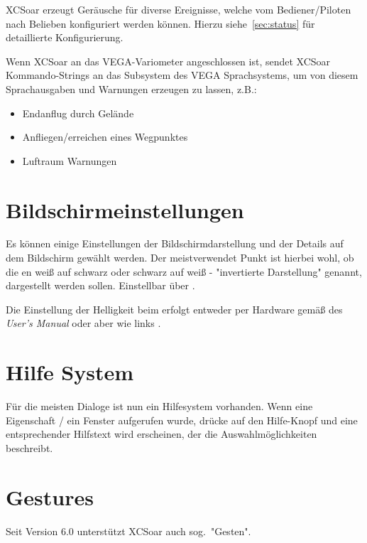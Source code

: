 \textsf{XCSoar} erzeugt Geräusche für diverse Ereignisse, welche vom Bediener/Piloten  nach Belieben konfiguriert werden können.
Hierzu siehe~\ref{sec:status} für detaillierte Konfigurierung.

Wenn \textsf{XCSoar} an das VEGA-Variometer angeschlossen ist,  sendet \textsf{XCSoar} Kommando-Strings an das Subsystem des VEGA Sprachsystems, um von diesem Sprachausgaben und Warnungen erzeugen zu lassen, z.B.:

\begin{itemize}
\item Endanflug durch Gelände
\item Anfliegen/erreichen eines Wegpunktes
\item Luftraum Warnungen
\end{itemize}

\section{Bildschirmeinstellungen}

Es können einige Einstellungen der Bildschirmdarstellung und der Details auf dem Bildschirm gewählt werden.  Der meistverwendet Punkt  ist hierbei wohl, ob die {\InfoBox}en weiß auf schwarz oder schwarz auf weiß - "invertierte Darstellung" genannt, dargestellt werden sollen.  Einstellbar über . 

Die Einstellung der Helligkeit beim \al erfolgt entweder per Hardware gemäß des {\em \al User's Manual} oder aber wie links .  




\section{Hilfe System}
  Für die meisten Dialoge ist nun ein Hilfesystem vorhanden.
  Wenn eine Eigenschaft / ein Fenster  aufgerufen wurde, drücke auf den Hilfe-Knopf und eine entsprechender Hilfstext wird erscheinen, der die Auswahlmöglichkeiten  beschreibt. 

\section{Gestures}\label{sec:gestures}
Seit Version 6.0 unterstützt \textsf{XCSoar} auch sog.\  "Gesten".

